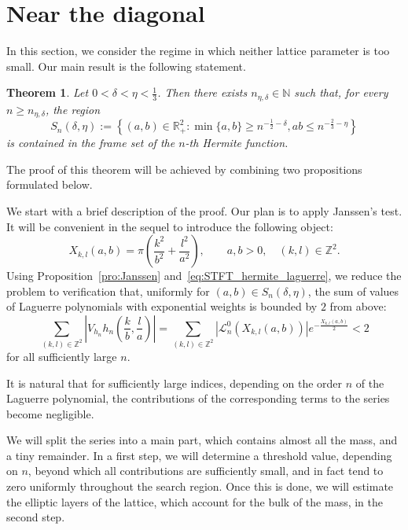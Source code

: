 \documentclass[11pt]{amsart}
\numberwithin{equation}{section}
\newtheorem{theorem}{Theorem}[section]
\newcommand{\R}{{\mathbb R}}
\newcommand{\Z}{{\mathbb Z}}
\newcommand{\N}{{\mathbb N}}
\begin{document}
\section{Near the diagonal}

In this section, we consider the regime in which neither lattice parameter is too small.
Our main result is the following statement.

\begin{theorem}\label{thm:Janssen_test}
    Let $0< \delta < \eta < \frac{1}{3}$. Then there exists $n_{\eta,\delta}\in\N$ such that, for every $n\geq n_{\eta,\delta}$, the region
    \begin{equation}\label{eq:diagonal_safety_region}
           S_n(\delta,\eta) := \left\{ (a,b) \in \R^2_+ : \min\{a,b\}\geq n^{-\frac12-\delta}, ab \leq n^{-\frac{2}{3}-\eta} \right\} 
        \end{equation}
is contained in the frame set of the $n$-th Hermite function.
\end{theorem}


The proof of this theorem will be achieved by combining two propositions formulated below. 

We start with a brief description of the proof. Our plan is to apply Janssen's test. 
It will be convenient in the sequel to introduce the following object:
\begin{equation}\label{eq:X_k,l}
    X_{k,l}(a,b)
    =\pi\left(\frac{k^2}{b^2}+\frac{l^2}{a^2}\right),
    \qquad a,b>0,\quad (k,l)\in\Z^2.
\end{equation}
Using Proposition~\ref{pro:Janssen} and~\eqref{eq:STFT_hermite_laguerre}, we reduce the problem to verification that, uniformly for $(a,b)\in S_n(\delta,\eta)$, the sum of values of Laguerre polynomials with exponential weights is bounded by $2$ from above:
\begin{equation}\label{eq:Janssen_sum}
    \sum_{(k,l)\in\Z^2}
    \left|V_{h_n}h_n\left(\frac{k}{b},\frac{l}{a}\right)\right|
    =\sum_{(k,l)\in\Z^2}
    \left|\mathcal L^0_n\left(X_{k,l}(a,b)\right)\right|
    e^{-\frac{X_{k,l}(a,b)}{2}}<2
\end{equation}
for all sufficiently large $n$.

It is natural that for sufficiently large indices, depending on the order $n$ of the Laguerre polynomial, the contributions of the corresponding terms to the series become negligible.

We will split the series into a main part, which contains almost all the mass, and a tiny remainder. In a first step, we will determine a threshold value, depending on $n$, beyond which all contributions are sufficiently small, and in fact tend to zero uniformly throughout the search region. Once this is done, we will estimate the elliptic layers of the lattice, which account for the bulk of the mass, in the second step.
\end{document}
